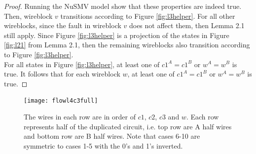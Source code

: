 \documentclass[12pt]{report}
\begin{document}
\begin{proof}
Running the NuSMV model show that these properties are indeed true.  Then, wireblock $v$ transitions according to Figure \ref{fig:l3helper}.  For all other wireblocks, since the fault in wireblock $v$ does not affect them, then Lemma 2.1 still apply.  Since Figure \ref{fig:l3helper} is a projection of the states in Figure \ref{fig:l21} from Lemma 2.1, then the remaining wireblocks also transition according to Figure \ref{fig:l3helper}.  \\

For all states in Figure \ref{fig:l3helper}, at least one of $c1^A=c1^B$ or $w^A=w^B$ is true. It follows that for each wireblock $w$, at least one of $c1^A=c1^B$ or $w^A=w^B$ is true.


\end{proof}

\begin{figure}
\centering
\texttt{[image: flowl4c3full]}
\caption[Wireblock transitions with fault on $c1^B$ or $w^B$]{The wires in each row are in order of $c1$, $c2$, $c3$ and $w$. Each row represents half of the duplicated circuit, i.e. top row are A half wires and bottom row are B half wires. Note that cases 6-10 are symmetric to cases 1-5 with the 0's and 1's inverted.}
\label{fig:l4}
\end{figure}
\end{document}
